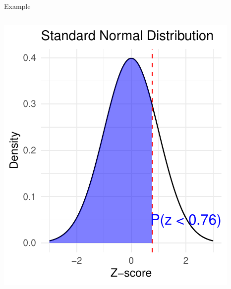 \documentclass[
  ignorenonframetext,
]{beamer}
\begin{document}
\begin{frame}[fragile]{Example}
\begin{columns}[T]
\begin{column}{0.5\textwidth}
\includegraphics{M5-Hypothesis-Testing,-Probability-and-Distribution_files/figure-beamer/unnamed-chunk-17-1.pdf}
\end{column}
\end{columns}
\end{frame}
\end{document}
